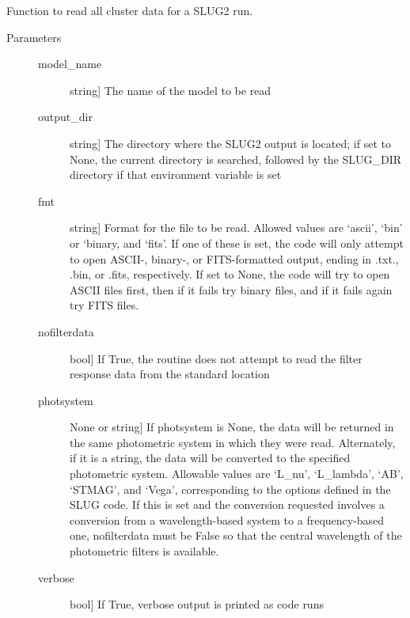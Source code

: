 \documentclass[letterpaper,10pt,english]{sphinxmanual}
\begin{document}
\begin{fulllineitems}
\label{\detokenize{slugpy:slugpy.read_cluster}}
Function to read all cluster data for a SLUG2 run.
\begin{description}
\item[{Parameters}] \leavevmode\begin{description}
\item[{model\_name}] \leavevmode{[}string{]}
The name of the model to be read

\item[{output\_dir}] \leavevmode{[}string{]}
The directory where the SLUG2 output is located; if set to None,
the current directory is searched, followed by the SLUG\_DIR
directory if that environment variable is set

\item[{fmt}] \leavevmode{[}string{]}
Format for the file to be read. Allowed values are ‘ascii’,
‘bin’ or ‘binary, and ‘fits’. If one of these is set, the code
will only attempt to open ASCII-, binary-, or FITS-formatted
output, ending in .txt., .bin, or .fits, respectively. If set
to None, the code will try to open ASCII files first, then if
it fails try binary files, and if it fails again try FITS
files.

\item[{nofilterdata}] \leavevmode{[}bool{]}
If True, the routine does not attempt to read the filter
response data from the standard location

\item[{photsystem}] \leavevmode{[}None or string{]}
If photsystem is None, the data will be returned in the same
photometric system in which they were read. Alternately, if it
is a string, the data will be converted to the specified
photometric system. Allowable values are ‘L\_nu’, ‘L\_lambda’,
‘AB’, ‘STMAG’, and ‘Vega’, corresponding to the options defined
in the SLUG code. If this is set and the conversion requested
involves a conversion from a wavelength-based system to a
frequency-based one, nofilterdata must be False so that the
central wavelength of the photometric filters is available.

\item[{verbose}] \leavevmode{[}bool{]}
If True, verbose output is printed as code runs


\end{description}
\end{description}
\end{fulllineitems}
\end{document}
